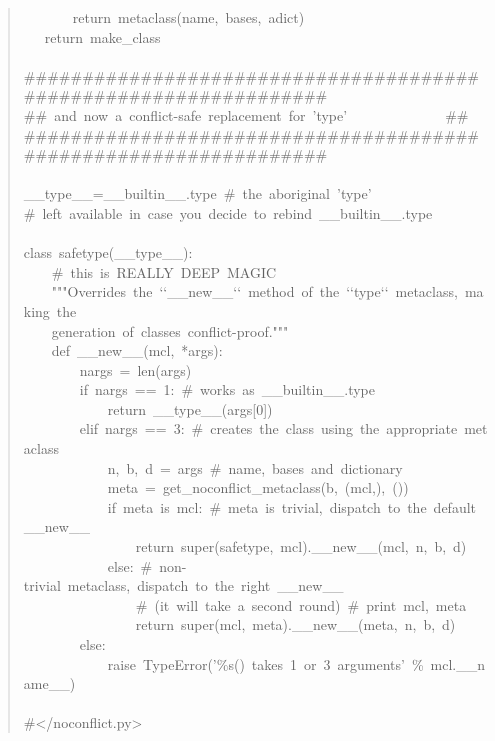 \documentclass[10pt,a4paper,english]{article}
\begin{document}
\begin{quote}
{~~~~~~~return~metaclass(name,~bases,~adict)~\\
~~~return~make{\_}class~\\
~\\
{\#}{\#}{\#}{\#}{\#}{\#}{\#}{\#}{\#}{\#}{\#}{\#}{\#}{\#}{\#}{\#}{\#}{\#}{\#}{\#}{\#}{\#}{\#}{\#}{\#}{\#}{\#}{\#}{\#}{\#}{\#}{\#}{\#}{\#}{\#}{\#}{\#}{\#}{\#}{\#}{\#}{\#}{\#}{\#}{\#}{\#}{\#}{\#}{\#}{\#}{\#}{\#}{\#}{\#}{\#}{\#}{\#}{\#}{\#}{\#}{\#}{\#}{\#}{\#}{\#}~\\
{\#}{\#}~and~now~a~conflict-safe~replacement~for~'type'~~~~~~~~~~~~~~{\#}{\#}~~\\
{\#}{\#}{\#}{\#}{\#}{\#}{\#}{\#}{\#}{\#}{\#}{\#}{\#}{\#}{\#}{\#}{\#}{\#}{\#}{\#}{\#}{\#}{\#}{\#}{\#}{\#}{\#}{\#}{\#}{\#}{\#}{\#}{\#}{\#}{\#}{\#}{\#}{\#}{\#}{\#}{\#}{\#}{\#}{\#}{\#}{\#}{\#}{\#}{\#}{\#}{\#}{\#}{\#}{\#}{\#}{\#}{\#}{\#}{\#}{\#}{\#}{\#}{\#}{\#}{\#}~\\
~\\
{\_}{\_}type{\_}{\_}={\_}{\_}builtin{\_}{\_}.type~{\#}~the~aboriginal~'type'~\\
{\#}~left~available~in~case~you~decide~to~rebind~{\_}{\_}builtin{\_}{\_}.type~\\
~\\
class~safetype({\_}{\_}type{\_}{\_}):~\\
~~~~{\#}~this~is~REALLY~DEEP~MAGIC~\\
~~~~"{}"{}"Overrides~the~`{}`{\_}{\_}new{\_}{\_}`{}`~method~of~the~`{}`type`{}`~metaclass,~making~the~\\
~~~~generation~of~classes~conflict-proof."{}"{}"~\\
~~~~def~{\_}{\_}new{\_}{\_}(mcl,~*args):~\\
~~~~~~~~nargs~=~len(args)~\\
~~~~~~~~if~nargs~==~1:~{\#}~works~as~{\_}{\_}builtin{\_}{\_}.type~\\
~~~~~~~~~~~~return~{\_}{\_}type{\_}{\_}(args{[}0])~~\\
~~~~~~~~elif~nargs~==~3:~{\#}~creates~the~class~using~the~appropriate~metaclass~\\
~~~~~~~~~~~~n,~b,~d~=~args~{\#}~name,~bases~and~dictionary~\\
~~~~~~~~~~~~meta~=~get{\_}noconflict{\_}metaclass(b,~(mcl,),~())~~\\
~~~~~~~~~~~~if~meta~is~mcl:~{\#}~meta~is~trivial,~dispatch~to~the~default~{\_}{\_}new{\_}{\_}~\\
~~~~~~~~~~~~~~~~return~super(safetype,~mcl).{\_}{\_}new{\_}{\_}(mcl,~n,~b,~d)~\\
~~~~~~~~~~~~else:~{\#}~non-trivial~metaclass,~dispatch~to~the~right~{\_}{\_}new{\_}{\_}~\\
~~~~~~~~~~~~~~~~{\#}~(it~will~take~a~second~round)~{\#}~print~mcl,~meta~\\
~~~~~~~~~~~~~~~~return~super(mcl,~meta).{\_}{\_}new{\_}{\_}(meta,~n,~b,~d)~\\
~~~~~~~~else:~\\
~~~~~~~~~~~~raise~TypeError('{\%}s()~takes~1~or~3~arguments'~{\%}~mcl.{\_}{\_}name{\_}{\_})~\\
~\\
{\#}</noconflict.py>
}\end{quote}
\end{document}
